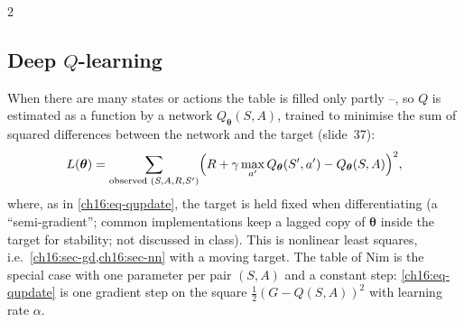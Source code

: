 \begin{paracol}{2}
\subsection{Deep $Q$-learning}
When there are many states or actions the table is filled only partly --, so $Q$ is estimated as a function by a network $Q_{\bm\theta}(S,A)$, trained to minimise the sum of squared differences between the network and the target  (slide~37):
\[
  L(\bm\theta)=\sum_{\text{observed }(S,A,R,S')}\Bigl(R+\gamma\max_{a'}Q_{\bm\theta}(S',a')-Q_{\bm\theta}(S,A)\Bigr)^2 ,
\]
where, as in \eqref{ch16:eq-qupdate}, the target is held fixed when differentiating (a ``semi-gradient''; common implementations keep a lagged copy of $\bm\theta$ inside the target for stability; not discussed in class). This is nonlinear least squares, i.e.\ \cref{ch16:sec-gd,ch16:sec-nn}
with a moving target. The table of Nim is the special case with one parameter per pair $(S,A)$ and a constant step: \eqref{ch16:eq-qupdate} is one gradient step on the square $\tfrac12(G-Q(S,A))^2$ with learning rate $\alpha$.


\end{paracol}
